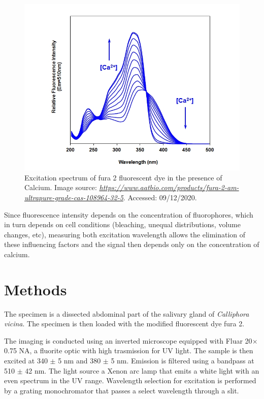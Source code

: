 \begin{figure}[h]
\centering
\includegraphics[width=.5\columnwidth]{Exp_8_CaImaging/Figures/fura2aatbio2}
\caption{Excitation spectrum of fura 2 fluorescent dye in the presence of Calcium. 
Image source: \href{https://www.aatbio.com/products/fura-2-am-ultrapure-grade-cas-108964-32-5}{\textit{https://www.aatbio.com/products/fura-2-am-ultrapure-grade-cas-108964-32-5}}. 
Accessed: 09/12/2020.} 
\label{fig:fura2}
\end{figure}

Since fluorescence intensity depends on the concentration of fluorophores, which in turn depends on cell conditions (bleaching, unequal distributions, volume changes, etc), measuring both excitation wavelength allows the elimination of these influencing factors and the signal then depends only on the concentration of calcium.


\section{Methods}

The specimen is a dissected abdominal part of the salivary gland of \textit{Calliphora vicina}. 
The specimen is then loaded with the modified fluorescent dye fura 2. 

The imaging is conducted using an inverted microscope equipped with Fluar 20$\times$ 0.75 NA, a fluorite optic with high trasmission for UV light. 
The sample is then excited at 340 $\pm$ 5 nm and 380 $\pm$ 5 nm. 
Emission is filtered using a bandpass at 510 $\pm$ 42 nm. 
The light source a Xenon arc lamp that emits a white light with an even spectrum in the UV range. 
Wavelength selection for excitation is performed by a grating monochromator that passes a select wavelength through a slit.  

